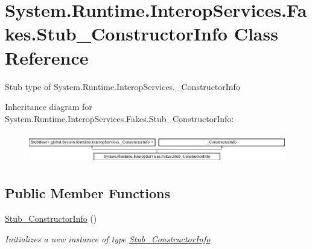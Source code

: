 \hypertarget{class_system_1_1_runtime_1_1_interop_services_1_1_fakes_1_1_stub___constructor_info}{\section{System.\-Runtime.\-Interop\-Services.\-Fakes.\-Stub\-\_\-\-Constructor\-Info Class Reference}
\label{class_system_1_1_runtime_1_1_interop_services_1_1_fakes_1_1_stub___constructor_info}
}


Stub type of System.\-Runtime.\-Interop\-Services.\-\_\-\-Constructor\-Info 


Inheritance diagram for System.\-Runtime.\-Interop\-Services.\-Fakes.\-Stub\-\_\-\-Constructor\-Info\-:\begin{figure}[H]
\begin{center}
\leavevmode
\includegraphics[height=1.352657cm]{class_system_1_1_runtime_1_1_interop_services_1_1_fakes_1_1_stub___constructor_info}
\end{center}
\end{figure}
\subsection*{Public Member Functions}
\begin{DoxyCompactItemize}
\item 
\hyperlink{class_system_1_1_runtime_1_1_interop_services_1_1_fakes_1_1_stub___constructor_info_ad5a6441d6b15c251a37574f7d3bfd6f1}{Stub\-\_\-\-Constructor\-Info} ()
\begin{DoxyCompactList}\small\item\em Initializes a new instance of type \hyperlink{class_system_1_1_runtime_1_1_interop_services_1_1_fakes_1_1_stub___constructor_info}{Stub\-\_\-\-Constructor\-Info}\end{DoxyCompactList}\end{DoxyCompactItemize}

